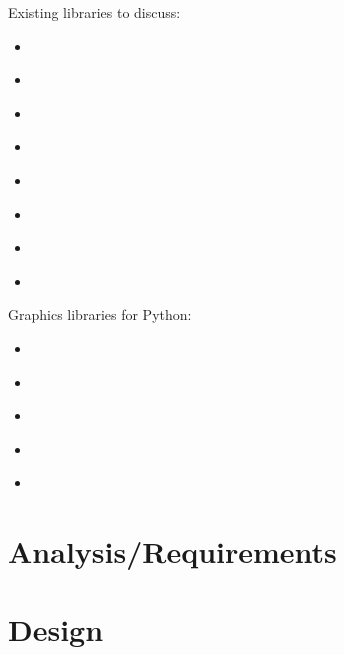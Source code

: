 \documentclass{l4proj}
\begin{document}
Existing libraries to discuss:
\begin{itemize}
    \item\citep{aides_nirjupylet_2024} %
    \item\citep{musy_marcomusyvedo_2023} %
    \item\citep{sullivan_pyvista_2019} %
    \item\citep{noauthor_vispy_nodate} %
    \item\citep{noauthor_itkwidgets_2023}
    \item\citep{noauthor_k3d_2023}
    \item\citep{noauthor_ipyvolume_2023}
    \item\citep{noauthor_bokeh_2023}
\end{itemize}


Graphics libraries for Python:
\begin{itemize}
    \item\citep{dombi_zengl_2023} %
    \item\citep{noauthor_glumpy_2023}
    \item\citep{noauthor_pyglet_2023}
    \item\citep{noauthor_moderngl_2023}
    \item\citep{noauthor_pythreejs_2023}
\end{itemize}

\chapter{Analysis/Requirements}\label{ch:analysis/requirements}


\chapter{Design}\label{ch:design}
\end{document}
